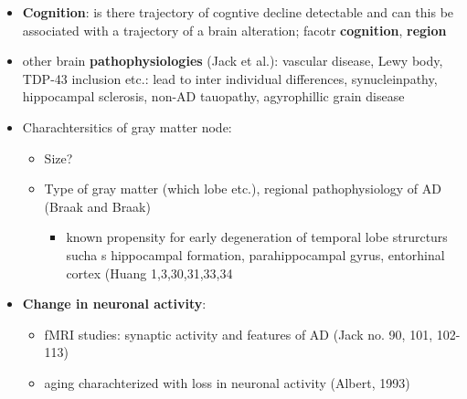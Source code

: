 \documentclass[fleqn]{article}\usepackage{caption}
\begin{document}
\begin{itemize}
\item \textbf{Cognition}: is there trajectory of cogntive decline detectable and can this be associated with a trajectory of a brain alteration; facotr \textbf{cognition}, \textbf{region}

\item other brain \textbf{pathophysiologies} (Jack et al.): vascular disease, Lewy body, TDP-43 inclusion etc.: lead to inter individual differences, synucleinpathy, hippocampal sclerosis, non-AD tauopathy, agyrophillic grain disease

\item Charachtersitics of gray matter node:
\begin{itemize}
\item Size?
\item Type of gray matter (which lobe etc.), regional pathophysiology of AD (Braak and Braak)
\begin{itemize}
\item known propensity for early degeneration of temporal lobe strurcturs sucha s hippocampal formation, parahippocampal gyrus, entorhinal cortex (Huang 1,3,30,31,33,34
\end{itemize}
\end{itemize}

\item \textbf{Change in neuronal activity}:
\begin{itemize}
\item fMRI studies: synaptic activity and features of AD (Jack no. 90, 101, 102-113)
\item aging charachterized with loss in neuronal activity (Albert, 1993)
\end{itemize}


\end{itemize}
\end{document}
